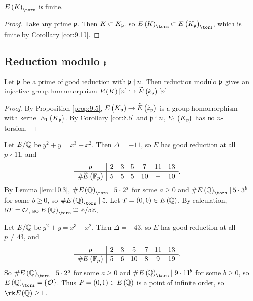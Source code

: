 \begin{lemma}
$ E\br{K}_{\tors} $ is finite.
\end{lemma}

\begin{proof}
Take any prime $ \mathfrak{p} $. Then $ K \subset K_{\mathfrak{p}} $, so $ E\br{K}_{\tors} \subset E\br{K_\ppp}_{\tors} $, which is finite by Corollary \ref{cor:9.10}.
\end{proof}

\subsection{Reduction modulo \texorpdfstring{$ \mathfrak{p} $}{p}}

\begin{lemma}
\label{lem:10.3}
Let $ \mathfrak{p} $ be a prime of good reduction with $ \mathfrak{p} \nmid n $. Then reduction modulo $ \mathfrak{p} $ gives an injective group homomorphism $ E\br{K}\sbr{n} \hookrightarrow \widetilde{E}\br{k_\ppp}\sbr{n} $.
\end{lemma}

\begin{proof}
By Proposition \ref{prop:9.5}, $ E\br{K_\ppp} \to \widetilde{E}\br{k_\ppp} $ is a group homomorphism with kernel $ E_1\br{K_\ppp} $. By Corollary \ref{cor:8.5} and $ \mathfrak{p} \nmid n $, $ E_1\br{K_\ppp} $ has no $ n $-torsion.
\end{proof}

\begin{example*}
Let $ E / \mathbb{Q} $ be $ y^2 + y = x^3 - x^2 $. Then $ \Delta = -11 $, so $ E $ has good reduction at all $ p \nmid 11 $, and
$$
\begin{array}{c|cccccc}
p & 2 & 3 & 5 & 7 & 11 & 13 \\
\hline
\#\widetilde{E}\br{\FF_p} & 5 & 5 & 5 & 10 & - & 10
\end{array}.
$$
By Lemma \ref{lem:10.3}, $ \#E\br{\QQ}_{\tors} \mid 5 \cdot 2^a $ for some $ a \ge 0 $ and $ \#E\br{\QQ}_{\tors} \mid 5 \cdot 3^b $ for some $ b \ge 0 $, so $ \#E\br{\QQ}_{\tors} \mid 5 $. Let $ T = \br{0, 0} \in E\br{\QQ} $. By calculation, $ 5T = \mathcal{O} $, so $ E\br{\QQ}_{\tors} \cong \ZZ / 5\ZZ $.
\end{example*}

\begin{example*}
Let $ E / \mathbb{Q} $ be $ y^2 + y = x^3 + x^2 $. Then $ \Delta = -43 $, so $ E $ has good reduction at all $ p \ne 43 $, and
$$
\begin{array}{c|cccccc}
p & 2 & 3 & 5 & 7 & 11 & 13 \\
\hline
\#\widetilde{E}\br{\FF_p} & 5 & 6 & 10 & 8 & 9 & 19
\end{array}.
$$
So $ \#E\br{\QQ}_{\tors} \mid 5 \cdot 2^a $ for some $ a \ge 0 $ and $ \#E\br{\QQ}_{\tors} \mid 9 \cdot 11^b $ for some $ b \ge 0 $, so $ E\br{\QQ}_{\tors} = \cbr{\OOO} $. Thus $ P = \br{0, 0} \in E\br{\QQ} $ is a point of infinite order, so $ \rk E\br{\QQ} \ge 1 $.
\end{example*}

